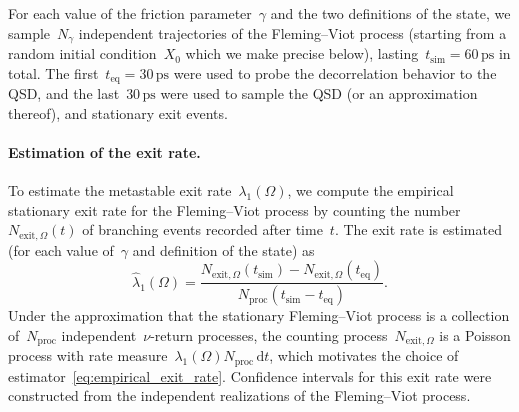 \documentclass[a4]{article}
\renewcommand{\d}{\mathrm{d}}
\newcommand{\1}{\mathbbm 1}
\begin{document}
For each value of the friction parameter~$\gamma$ and the two definitions of the state, we sample~$N_{\gamma}$ independent trajectories of the Fleming--Viot process (starting from a random initial condition~$X_0$ which we make precise below), lasting~$t_{\mathrm{sim}}=60\,\mathrm{ps}$ in total. The first~$t_{\mathrm{eq}}=30\,\mathrm{ps}$ were used to probe the decorrelation behavior to the QSD, and the last~$30\,\mathrm{ps}$ were used to sample the QSD (or an approximation thereof), and stationary exit events.

\paragraph{Estimation of the exit rate.}
To estimate the metastable exit rate~$\lambda_1(\Omega)$, we compute the empirical stationary exit rate for the Fleming--Viot process by counting the number~$N_{\mathrm{exit},\Omega}(t)$ of branching events recorded after time~$t$.
The exit rate is estimated (for each value of~$\gamma$ and definition of the state) as
\begin{equation}
    \label{eq:empirical_exit_rate}
    \widehat{\lambda}_1(\Omega) = \frac{N_{\mathrm{exit},\Omega}(t_{\mathrm{sim}})-N_{\mathrm{exit},\Omega}(t_{\mathrm{eq}})}{N_{\mathrm{proc}}\left(t_{\mathrm{sim}}-t_{\mathrm{eq}}\right)}.
\end{equation}
Under the approximation that the stationary Fleming--Viot process is a collection of~$N_{\mathrm{proc}}$ independent~$\nu$-return processes, the counting process~$N_{\mathrm{exit},\Omega}$ is a Poisson process with rate measure~$\lambda_1(\Omega)N_{\mathrm{proc}}\,\d t$, which motivates the choice of estimator~\eqref{eq:empirical_exit_rate}.
Confidence intervals for this exit rate were constructed from the independent realizations of the Fleming--Viot process.
\end{document}
